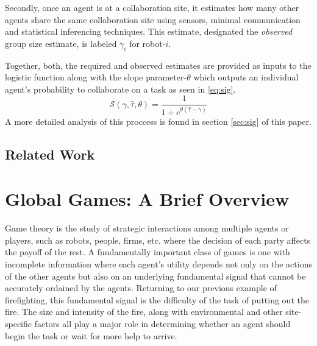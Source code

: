 \documentclass[conference]{ieeeconf}
\def\estt{\hat{\tau}}
\def\estg{\gamma}
\newcommand{\sig}{\mathcal{S}}
\begin{document}
Secondly, once an agent is at a collaboration site, it estimates how many other agents share the same collaboration site using sensors, minimal communication and statistical inferencing techniques. This estimate, designated the \emph{observed} group size estimate, is labeled $\estg_i$ for robot-$i$.

Together, both, the required and observed estimates are provided as inputs to the logistic function along with the slope parameter-$\theta$ which outputs an individual agent's probability to collaborate on a task as seen in \eqref{eq:sig}.
\begin{equation}\label{eq:sig}
	\sig(\estg, \estt, \theta) = \frac{1}{1 + e^{\theta(\estt - \estg)}}
\end{equation}
A more detailed analysis of this proccess is found in section \ref{sec:sig} of this paper.



\subsection{Related Work}\label{subsec:rw}



\section{Global Games: A Brief Overview}\label{sec:ggoverview}
Game theory is the study of strategic interactions among multiple agents or players, such as robots, people, firms, etc. where the decision of each party affects the payoff of the rest. A fundamentally important class of games is one with incomplete information where each agent's utility depends not only on the actions of the other agents but also on an underlying fundamental signal that cannot be accurately ordained by the agents. Returning to our previous example of firefighting, this fundamental signal is the difficulty of the task of putting out the fire. The size and intensity of the fire, along with environmental and other site-specific factors all play a major role in determining whether an agent should begin the task or wait for more help to arrive. 
\end{document}
